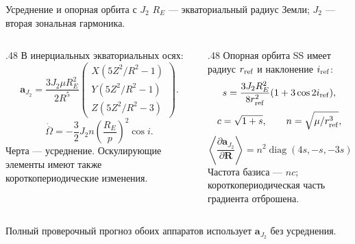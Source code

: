 \documentclass[11pt,aspectratio=169,t]{beamer}
\newcommand{\eqcompact}{\fontsize{10}{12}\selectfont}
\newcommand{\derivationmathspacing}{%
  \setlength{\abovedisplayskip}{2pt}%
  \setlength{\belowdisplayskip}{3pt}%
  \setlength{\abovedisplayshortskip}{2pt}%
  \setlength{\belowdisplayshortskip}{2pt}%
  \setlength{\jot}{2pt}}
\newcommand{\vect}[1]{\boldsymbol{#1}}
\begin{document}
\begin{frame}{Усреднение и опорная орбита с $J_2$}
\relax
\derivationmathspacing
$R_E$ --- экваториальный радиус Земли; $J_2$ --- вторая зональная гармоника.
\begin{columns}[T,onlytextwidth]
\begin{column}{.48\textwidth}
В инерциальных экваториальных осях:
{\eqcompact\derivationmathspacing
\[
 \vect a_{J_2}=\frac{3J_2\mu R_E^2}{2R^5}
 \begin{pmatrix}
 X(5Z^2/R^2-1)\\[2pt]
 Y(5Z^2/R^2-1)\\[2pt]
 Z(5Z^2/R^2-3)
 \end{pmatrix}.
\]
\[
 \dot{\overline\Omega}
 =-\frac32J_2n\left(\frac{R_E}{p}\right)^2\cos i.
\]
}
\justifying
Черта --- усреднение. Оскулирующие элементы имеют также короткопериодические изменения.
\end{column}
\begin{column}{.48\textwidth}
Опорная орбита SS имеет радиус $r_{\rm ref}$ и наклонение $i_{\rm ref}$:
{\eqcompact\derivationmathspacing
\[
 s=\frac{3J_2R_E^2}{8r_{\rm ref}^2}(1+3\cos2i_{\rm ref}),
\]
\[
 c=\sqrt{1+s},\qquad n=\sqrt{\mu/r_{\rm ref}^3},
\]
\[
 \left\langle\frac{\partial\vect a_{J_2}}{\partial\vect R}\right\rangle
 =n^2\operatorname{diag}(4s,-s,-3s).
\]
}
\justifying
Частота базиса --- $nc$; короткопериодическая часть градиента отброшена.
\end{column}
\end{columns}
\smallskip
Полный проверочный прогноз обоих аппаратов использует $\vect a_{J_2}$ без усреднения.
\end{frame}
\end{document}
